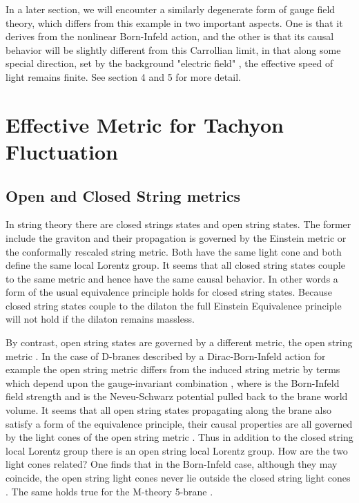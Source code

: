 \documentclass[a4paper,12pt]{article}
\begin{document}
In a later section, we will encounter a similarly degenerate form of
gauge field theory, which differs from this example in two important 
aspects. One is that it derives from the nonlinear Born-Infeld action,
and the other is that its causal behavior will be slightly different
from this Carrollian limit, in that along some special direction, set 
by the background "electric field" \coordHE{}, the effective speed of
light remains finite. See section 4 and 5 for more detail.




\section{Effective Metric for Tachyon Fluctuation}

\subsection{Open and Closed String metrics}


In string theory there are closed strings states and open string
states. The former include the graviton and their propagation is
governed by the Einstein metric \coordHE{} or the conformally
rescaled string metric. Both have the same light cone and both
define the same local Lorentz group. It seems that all closed
string states  couple to the same metric and hence have the same
causal behavior. In other words  a form of the usual equivalence
principle holds for closed string states. Because closed string
states  couple to the dilaton the full Einstein Equivalence
principle will not hold if the dilaton remains massless.

By contrast, open string states are governed by a different
metric, the open string metric \coordHE{}. In
the case of D-branes described by a Dirac-Born-Infeld action for
example the open string metric differs from the induced string
metric \coordHE{}  by terms which depend upon the
gauge-invariant combination 
\coordHE{}, 
where \coordHE{} is the Born-Infeld field strength  and
\coordHE{} is the  Neveu-Schwarz potential pulled back
to the brane world volume. It seems that all open string states
propagating along the brane also satisfy a form of the equivalence
principle, their causal properties are all governed by the light
cones of the open string metric \coordHE{}. Thus in addition to
the closed string local Lorentz group there is an open string
local Lorentz group. How are the two light cones related? One
finds that in the Born-Infeld case, although they may
coincide, the open string light cones never lie outside the closed
string light cones \cite{Herdeiro, Gibbons2, Gibbons3}. The same
holds true for the M-theory 5-brane \cite{West}.
\end{document}

